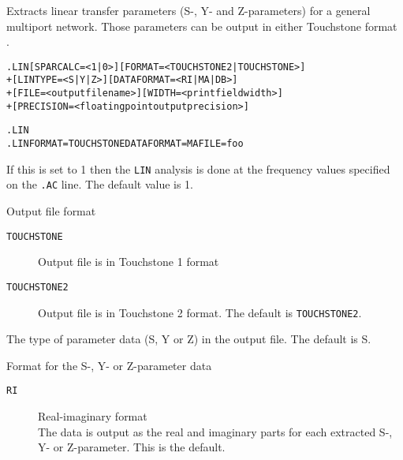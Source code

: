 


Extracts linear transfer parameters (S-, Y- and Z-parameters) for a general
multiport network.  Those parameters can be output in either
Touchstone format \cite{touchstone2_std_2009}.

\begin{Command}

\format
\begin{alltt}
.LIN [SPARCALC=<1|0>] [FORMAT=<TOUCHSTONE2|TOUCHSTONE>]
+ [LINTYPE=<S|Y|Z>] [DATAFORMAT=<RI|MA|DB>]
+ [FILE=<output filename>] [WIDTH=<print field width>]
+ [PRECISION=<floating point output precision>]
\end{alltt}

\examples
\begin{alltt}
.LIN
.LIN FORMAT=TOUCHSTONE DATAFORMAT=MA FILE=foo
\end{alltt}

\arguments

\begin{Arguments}

If this is set to 1 then the \texttt{LIN} analysis is done
at the frequency values specified on the \texttt{.AC} line.
The default value is 1.

 Output file format
\begin{description}
\item[\tt TOUCHSTONE] Output file is in Touchstone 1 format

\item[\tt TOUCHSTONE2] Output file is in Touchstone 2 format. The default
is \texttt{TOUCHSTONE2}.
\end{description}

 The type of parameter data (S, Y or Z) in the
output file.  The default is S.

 Format for the S-, Y- or Z-parameter data

\begin{description}
\item[\tt RI] Real-imaginary format \\
The data is output as the real and imaginary parts for each
extracted S-, Y- or Z-parameter.  This is the default.


\end{description}
\end{Arguments}
\end{Command}
